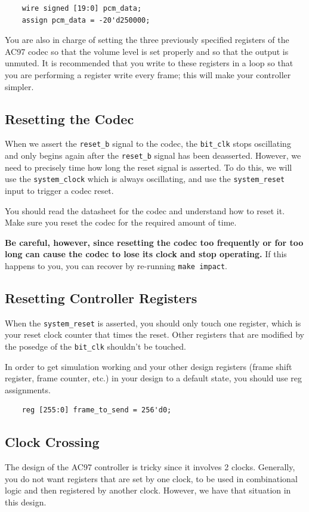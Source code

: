 \documentclass[11pt]{article}
\begin{document}
\begin{verbatim}
	wire signed [19:0] pcm_data;
	assign pcm_data = -20'd250000;
\end{verbatim}

You are also in charge of setting the three previously specified registers of the AC97 codec so that the volume level is set properly and so that the output is unmuted. It is recommended that you write to these registers in a loop so that you are performing a register write every frame; this will make your controller simpler.

\subsection{Resetting the Codec}
When we assert the \verb|reset_b| signal to the codec, the \verb|bit_clk| stops oscillating and only begins again after the \verb|reset_b| signal has been deasserted. However, we need to precisely time how long the reset signal is asserted. To do this, we will use the \verb|system_clock| which is always oscillating, and use the \verb|system_reset| input to trigger a codec reset.

You should read the datasheet for the codec and understand how to reset it. Make sure you reset the codec for the required amount of time. 

\textbf{Be careful, however, since resetting the codec too frequently or for too long can cause the codec to lose its clock and stop operating.} If this happens to you, you can recover by re-running \verb|make impact|.

\subsection{Resetting Controller Registers}
When the \verb|system_reset| is asserted, you should only touch one register, which is your reset clock counter that times the reset. Other registers that are modified by the posedge of the \verb|bit_clk| shouldn't be touched.

In order to get simulation working and your other design registers (frame shift register, frame counter, etc.) in your design to a default state, you should use reg assignments.

\begin{verbatim}
	reg [255:0] frame_to_send = 256'd0;
\end{verbatim}

\subsection{Clock Crossing}
The design of the AC97 controller is tricky since it involves 2 clocks. Generally, you do not want registers that are set by one clock, to be used in combinational logic and then registered by another clock. However, we have that situation in this design.
\end{document}
